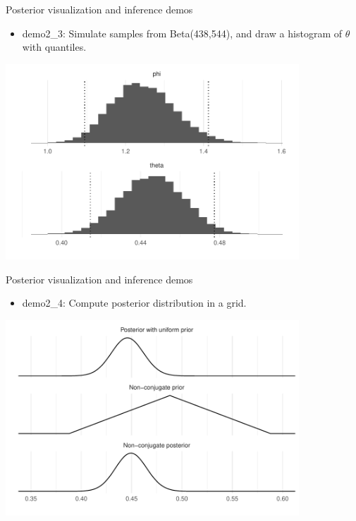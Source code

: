 \documentclass[english,t]{beamer}
\begin{document}
\begin{frame}{Posterior visualization and inference demos}

  \begin{itemize}
  \item demo2\_3: Simulate samples from Beta(438,544), and draw
    a histogram of $\theta$ with quantiles.
  \end{itemize}
  \vspace{-\baselineskip}
  \begin{center}
    \includegraphics[width=11cm]{figs/demo2_3.pdf}
  \end{center}
\end{frame}

\begin{frame}{Posterior visualization and inference demos}

  \begin{itemize}
  \item demo2\_4: Compute posterior distribution in a grid.
  \end{itemize}
  \includegraphics[width=11cm]{figs/demo2_4a.pdf}
\end{frame}
\end{document}
